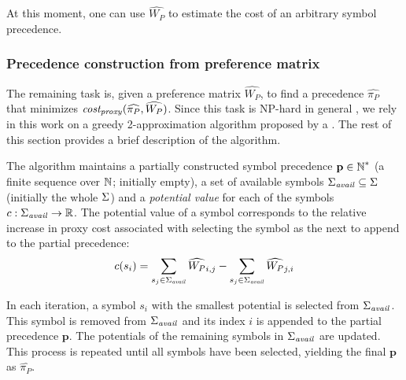 At this moment, one can use \(\widehat{W_P}\) to estimate the cost of an arbitrary symbol precedence.

\subsubsection{Precedence construction from preference matrix} \label{sect:ltot}

The remaining task is, given a preference matrix \(\widehat{W_P}\), to find a precedence \(\widehat{\pi_P}\)
that minimizes \(\operatorname{\mathit{cost_{proxy}}}(\widehat{\pi_P}, \widehat{W_P})\).
Since this task is NP-hard in general \cite{Cohen2011},
we rely in this work on a greedy 2-approximation algorithm
proposed by a \citet{Cohen2011}.
The rest of this section provides a brief description of the algorithm.

\newcommand{\SymbolsAvail}{\symbols_{\mathit{avail}}}
\newcommand{\potential}{c}

The algorithm maintains a partially constructed symbol precedence \(\mathbf{p} \in \operatorname{\mathbb{N}}^*\)
(a finite sequence over \(\operatorname{\mathbb{N}}\); initially empty),
a set of available symbols \(\SymbolsAvail \subseteq \symbols\) (initially the whole \(\operatorname{\Sigma}\))
and a \emph{potential value} for each of the symbols \(\potential: \SymbolsAvail \to \re\).
The potential value of a symbol corresponds to the relative increase in proxy cost
associated with selecting the symbol as the next to append to the partial precedence:
\begin{align*}
\potential(s_i) = \sum_{s_j \in \SymbolsAvail} \widehat{W_P}_{i, j} - \sum_{s_j \in \SymbolsAvail} \widehat{W_P}_{j, i}
\end{align*}

In each iteration, a symbol \(s_i\) with the smallest potential is selected from \(\SymbolsAvail\).
This symbol is removed from \(\SymbolsAvail\)
and its index \(i\) is appended to the partial precedence \(\mathbf{p}\).
The potentials of the remaining symbols in \(\SymbolsAvail\) are updated.
This process is repeated until all symbols have been selected,
yielding the final \(\mathbf{p}\) as \(\widehat{\pi_P}\).



